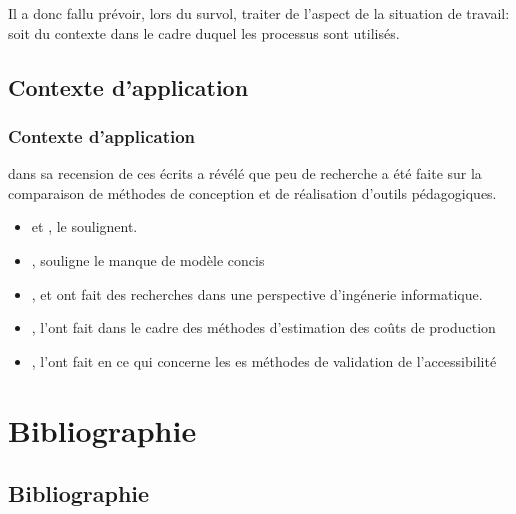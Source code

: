 \begin{frame}[allowframebreaks]
\par  Il a donc fallu prévoir, lors du survol, traiter de l’aspect de la situation de travail: soit du contexte dans le cadre duquel les processus sont utilisés.
                \end{frame}

\subsection{Contexte d'application} 
		\begin{frame}[allowframebreaks]
			\frametitle{Contexte d'application}
                        \citet{bonneau2013a} dans sa recension de ces écrits a révélé que peu de recherche a été faite sur la comparaison de méthodes de conception et de réalisation d’outils pédagogiques. 
                        \begin{itemize} 
                        \item \citet{koch1999a} et \citet{armani2004a}, le soulignent.
                        \item \citet{frey2010a}, souligne le manque de modèle concis
                        \item \citet{escalona2002a}, \citet{lang2003a} et \citet{escalona2004a} ont fait des recherches dans une perspective d'ingénerie informatique.
                        \item \citet{mendes2003a}, l'ont fait dans le cadre des  méthodes d’estimation des coûts de production
                        \item \citet{mankoff2005a}, l'ont fait en ce qui concerne les es méthodes de validation de l’accessibilité   
                        \end{itemize}

                \end{frame}



\section{Bibliographie}
\subsection{Bibliographie}


